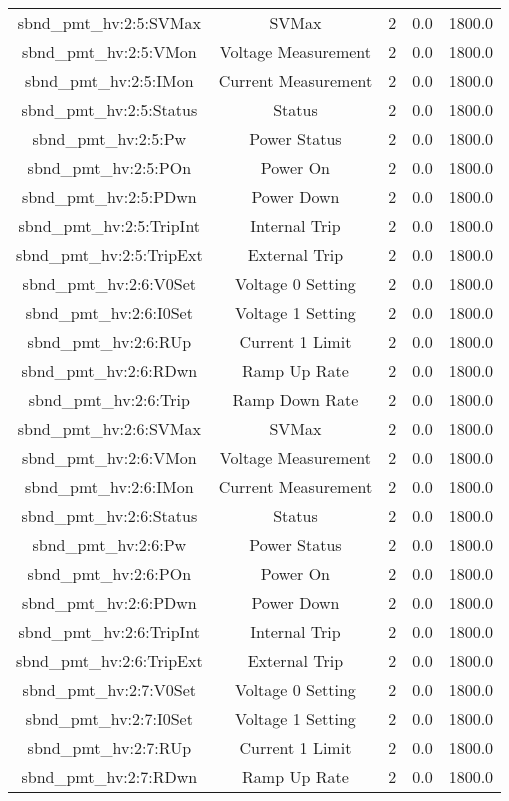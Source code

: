 \begin{table}[ptb]
\begin{tabular}{c | c c c c}
sbnd_pmt_hv:2:5:SVMax & SVMax & 2 & 0.0 & 1800.0\\ 
sbnd_pmt_hv:2:5:VMon & Voltage Measurement & 2 & 0.0 & 1800.0\\ 
sbnd_pmt_hv:2:5:IMon & Current Measurement & 2 & 0.0 & 1800.0\\ 
sbnd_pmt_hv:2:5:Status & Status & 2 & 0.0 & 1800.0\\ 
sbnd_pmt_hv:2:5:Pw & Power Status & 2 & 0.0 & 1800.0\\ 
sbnd_pmt_hv:2:5:POn & Power On & 2 & 0.0 & 1800.0\\ 
sbnd_pmt_hv:2:5:PDwn & Power Down & 2 & 0.0 & 1800.0\\ 
sbnd_pmt_hv:2:5:TripInt & Internal Trip & 2 & 0.0 & 1800.0\\ 
sbnd_pmt_hv:2:5:TripExt & External Trip & 2 & 0.0 & 1800.0\\ 
sbnd_pmt_hv:2:6:V0Set & Voltage 0 Setting & 2 & 0.0 & 1800.0\\ 
sbnd_pmt_hv:2:6:I0Set & Voltage 1 Setting & 2 & 0.0 & 1800.0\\ 
sbnd_pmt_hv:2:6:RUp & Current 1 Limit & 2 & 0.0 & 1800.0\\ 
sbnd_pmt_hv:2:6:RDwn & Ramp Up Rate & 2 & 0.0 & 1800.0\\ 
sbnd_pmt_hv:2:6:Trip & Ramp Down Rate & 2 & 0.0 & 1800.0\\ 
sbnd_pmt_hv:2:6:SVMax & SVMax & 2 & 0.0 & 1800.0\\ 
sbnd_pmt_hv:2:6:VMon & Voltage Measurement & 2 & 0.0 & 1800.0\\ 
sbnd_pmt_hv:2:6:IMon & Current Measurement & 2 & 0.0 & 1800.0\\ 
sbnd_pmt_hv:2:6:Status & Status & 2 & 0.0 & 1800.0\\ 
sbnd_pmt_hv:2:6:Pw & Power Status & 2 & 0.0 & 1800.0\\ 
sbnd_pmt_hv:2:6:POn & Power On & 2 & 0.0 & 1800.0\\ 
sbnd_pmt_hv:2:6:PDwn & Power Down & 2 & 0.0 & 1800.0\\ 
sbnd_pmt_hv:2:6:TripInt & Internal Trip & 2 & 0.0 & 1800.0\\ 
sbnd_pmt_hv:2:6:TripExt & External Trip & 2 & 0.0 & 1800.0\\ 
sbnd_pmt_hv:2:7:V0Set & Voltage 0 Setting & 2 & 0.0 & 1800.0\\ 
sbnd_pmt_hv:2:7:I0Set & Voltage 1 Setting & 2 & 0.0 & 1800.0\\ 
sbnd_pmt_hv:2:7:RUp & Current 1 Limit & 2 & 0.0 & 1800.0\\ 
sbnd_pmt_hv:2:7:RDwn & Ramp Up Rate & 2 & 0.0 & 1800.0\\ 

\end{tabular}
\end{table}
